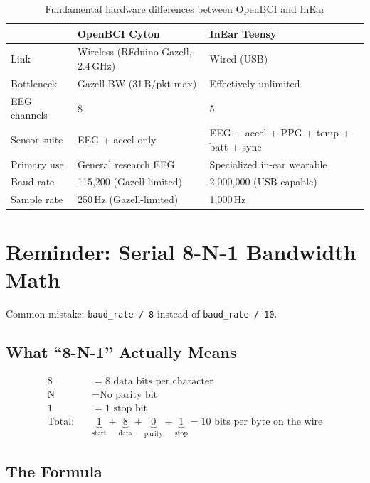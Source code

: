 \documentclass[11pt,a4paper]{article}
\begin{document}
\begin{table}[H]
\centering
\begin{tabular}{|l|l|l|}
\hline
& \textbf{OpenBCI Cyton} & \textbf{InEar Teensy} \\\hline
\hline
Link & Wireless (RFduino Gazell, 2.4\,GHz) & Wired (USB) \\
Bottleneck & Gazell BW (31\,B/pkt max) & Effectively unlimited \\
EEG channels & 8 & 5 \\
Sensor suite & EEG + accel only & EEG + accel + PPG + temp + batt + sync \\
Primary use & General research EEG & Specialized in-ear wearable \\
Baud rate & 115,200 (Gazell-limited) & 2,000,000 (USB-capable) \\
Sample rate & 250\,Hz (Gazell-limited) & 1,000\,Hz \\
\hline
\end{tabular}
\caption{Fundamental hardware differences between OpenBCI and InEar}
\end{table}

\section{Reminder: Serial 8-N-1 Bandwidth Math}
\label{sec:appendix-serial-math}

{\sloppy Common mistake: \texttt{baud\_rate~/~8} instead of \texttt{baud\_rate~/~10}.\par}

\subsection{What ``8-N-1'' Actually Means}

\begin{align}
8 &= 8 \text{ data bits per character} \nonumber\\
\text{N} &= \text{No parity bit} \nonumber\\
1 &= 1 \text{ stop bit} \nonumber\\[1em]
\text{Total:} \quad & \underbrace{1}_{\text{start}} + \underbrace{8}_{\text{data}} + \underbrace{0}_{\text{parity}} + \underbrace{1}_{\text{stop}} = 10 \text{ bits per byte on the wire} \nonumber
\end{align}

\subsection{The Formula}
\end{document}
